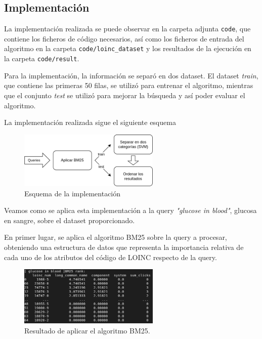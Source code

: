 \documentclass[a4paper,12pt]{article}
\begin{document}
	\subsection{Implementación}
	
	La implementación realizada se puede observar en la carpeta adjunta \texttt{code}, que contiene los ficheros de código necesarios, así como los ficheros de entrada del algoritmo en la carpeta \texttt{code/loinc\_dataset} y los resultados de la ejecución en la carpeta \texttt{code/result}.
	
	Para la implementación, la información se separó en dos dataset. El dataset \textit{train}, que contiene las primeras 50 filas, se utilizó para entrenar el algoritmo, mientras que el conjunto \textit{test} se utilizó para mejorar la búsqueda y así poder evaluar el algoritmo.
	
	La implementación realizada sigue el siguiente esquema
	
	\begin{figure}[H]
		\centering
		\includegraphics[width=0.6\textwidth]{include/esquema_implementacion.png}
		\caption{Esquema de la implementación}
	\end{figure}
	
	Veamos como se aplica esta implementación a la query \textit{"glucose in blood"}, glucosa en sangre, sobre el dataset proporcionado. 
	
	En primer lugar, se aplica el algoritmo BM25 sobre la query a procesar, obteniendo una estructura de datos que representa la importancia relativa de cada uno de los atributos del código de LOINC respecto de la query.
	
	\begin{figure}[H]
		\centering
		\includegraphics[width=0.6\textwidth]{include/bm25rank_glucoseBlood.png}
		\caption{Resultado de aplicar el algoritmo BM25.}
	\end{figure}
\end{document}
